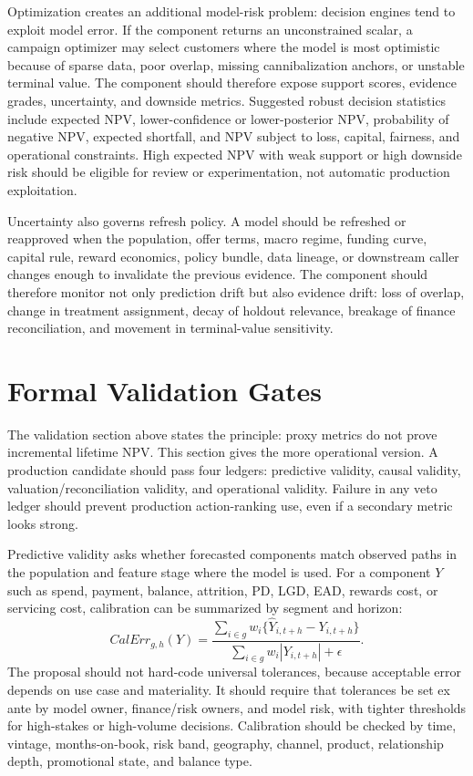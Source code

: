 \documentclass[11pt]{article}
\newcommand{\1}{\mathbf{1}}
\begin{document}
Optimization creates an additional model-risk problem: decision engines tend
to exploit model error. If the component returns an unconstrained scalar, a
campaign optimizer may select customers where the model is most optimistic
because of sparse data, poor overlap, missing cannibalization anchors, or
unstable terminal value. The component should therefore expose support scores,
evidence grades, uncertainty, and downside metrics. Suggested robust decision
statistics include expected NPV, lower-confidence or lower-posterior NPV,
probability of negative NPV, expected shortfall, and NPV subject to loss,
capital, fairness, and operational constraints. High expected NPV with weak
support or high downside risk should be eligible for review or experimentation,
not automatic production exploitation.

Uncertainty also governs refresh policy. A model should be refreshed or
reapproved when the population, offer terms, macro regime, funding curve,
capital rule, reward economics, policy bundle, data lineage, or downstream
caller changes enough to invalidate the previous evidence. The component
should therefore monitor not only prediction drift but also evidence drift:
loss of overlap, change in treatment assignment, decay of holdout relevance,
breakage of finance reconciliation, and movement in terminal-value
sensitivity.

\section{Formal Validation Gates}
\label{sec:validation-gates-formal}

The validation section above states the principle: proxy metrics do not prove
incremental lifetime NPV. This section gives the more operational version. A
production candidate should pass four ledgers: predictive validity, causal
validity, valuation/reconciliation validity, and operational validity. Failure
in any veto ledger should prevent production action-ranking use, even if a
secondary metric looks strong.

Predictive validity asks whether forecasted components match observed paths
in the population and feature stage where the model is used. For a component
$Y$ such as spend, payment, balance, attrition, PD, LGD, EAD, rewards cost, or
servicing cost, calibration can be summarized by segment and horizon:
\begin{equation}
  CalErr_{g,h}(Y)
  =
  \frac{
    \sum_{i\in g} w_i
    \{\widehat{Y}_{i,t+h}-Y_{i,t+h}\}
  }{
    \sum_{i\in g} w_i |Y_{i,t+h}|+\epsilon
  }.
  \label{eq:calibration-error}
\end{equation}
The proposal should not hard-code universal tolerances, because acceptable
error depends on use case and materiality. It should require that tolerances
be set ex ante by model owner, finance/risk owners, and model risk, with
tighter thresholds for high-stakes or high-volume decisions. Calibration
should be checked by time, vintage, months-on-book, risk band, geography,
channel, product, relationship depth, promotional state, and balance type.
\end{document}

